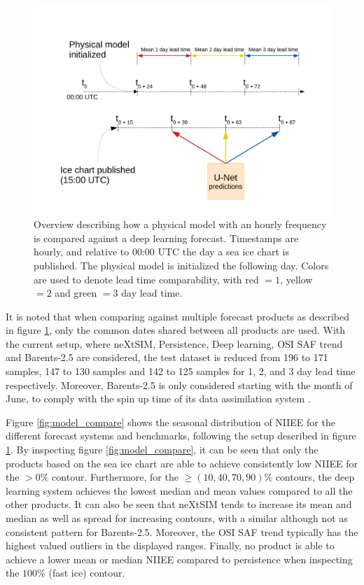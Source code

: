 \documentclass[../main/thesis.tex]{subfiles}
\begin{document}
\begin{figure}
    \centering
    \includegraphics[width=\textwidth]{product_compare_timeline}
    \caption{\label{fig:product_compare_timeline}Overview describing how a physical model with an hourly frequency is compared against a deep learning forecast. Timestamps are hourly, and relative to 00:00 UTC the day a sea ice chart is published. The physical model is initialized the following day. Colors are used to denote lead time comparability, with red $= 1$, yellow $= 2$ and green $= 3$ day lead time.}
\end{figure}

It is noted that when comparing against multiple forecast products as described in figure \ref{fig:product_compare_timeline}, only the common dates shared between all products are used. With the current setup, where neXtSIM, Persistence, Deep learning, OSI SAF trend and Barents-2.5 are considered, the test dataset is reduced from 196 to 171 samples, 147 to 130 samples and 142 to 125 samples for 1, 2, and 3 day lead time respectively. Moreover, Barents-2.5 is only considered starting with the month of June, to comply with the spin up time of its data assimilation system \citep{Roehrs2022}.

Figure \ref{fig:model_compare} shows the seasonal distribution of NIIEE for the different forecast systems and benchmarks, following the setup described in figure \ref{fig:product_compare_timeline}. By inspecting figure \ref{fig:model_compare}, it can be seen that only the products based on the sea ice chart are able to achieve consistently low NIIEE for the $>0\%$ contour. Furthermore, for the $\geq(10, 40, 70, 90)\%$ contours, the deep learning system achieves the lowest median and mean values compared to all the other products. It can also be seen that neXtSIM tends to increase its mean and median as well as spread for increasing contours, with a similar although not as consistent pattern for Barents-2.5. Moreover, the OSI SAF trend typically has the highest valued outliers in the displayed ranges. Finally, no product is able to achieve a lower mean or median NIIEE compared to persistence when inspecting the $100\%$ (fast ice) contour. 
\end{document}

